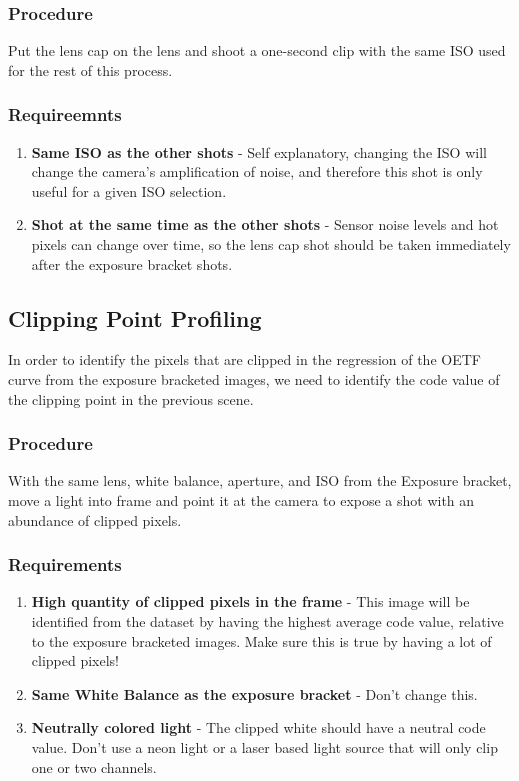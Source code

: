 \documentclass[twoside]{article}
\begin{document}
\subsubsection{Procedure}
Put the lens cap on the lens and shoot a one-second clip with the same ISO used for the rest of this process.

\subsubsection{Requireemnts}
\begin{enumerate}
    \item \textbf{Same ISO as the other shots} - Self explanatory, changing the ISO will change the camera's amplification of noise, and therefore this shot is only useful for a given ISO selection.
    \item \textbf{Shot at the same time as the other shots} - Sensor noise levels and hot pixels can change over time, so the lens cap shot should be taken immediately after the exposure bracket shots.
\end{enumerate}


\subsection{Clipping Point Profiling}
In order to identify the pixels that are clipped in the regression of the OETF curve from the exposure bracketed images, we need to identify the code value of the clipping point in the previous scene.

\subsubsection{Procedure}
With the same lens, white balance, aperture, and ISO from the Exposure bracket, move a light into frame and point it at the camera to expose a shot with an abundance of clipped pixels.

\subsubsection{Requirements}
\begin{enumerate}
    \item \textbf{High quantity of clipped pixels in the frame} - This image will be identified from the dataset by having the highest average code value, relative to the exposure bracketed images. Make sure this is true by having a lot of clipped pixels!
    \item \textbf{Same White Balance as the exposure bracket} - Don't change this.
    \item \textbf{Neutrally colored light} - The clipped white should have a neutral code value. Don't use a neon light or a laser based light source that will only clip one or two channels.
\end{enumerate}
\end{document}
